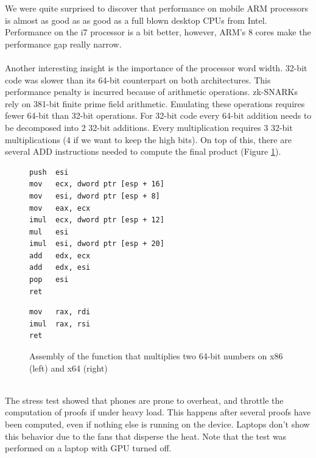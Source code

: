We were quite surprised to discover that performance on mobile ARM processors is almost as good as as good as a full blown desktop CPUs from Intel. Performance on the i7 processor is a bit better, however, ARM's 8 cores make the performance gap really narrow.\\
\\
Another interesting insight is the importance of the processor word width. 32-bit code was slower than its 64-bit counterpart on both architectures. This performance penalty is incurred because of arithmetic operations. zk-SNARKs rely on 381-bit finite prime field arithmetic. Emulating these operations requires fewer 64-bit than 32-bit operations. For 32-bit code every 64-bit addition needs to be decomposed into 2 32-bit additions. Every multiplication requires 3 32-bit multiplications (4 if we want to keep the high bits). On top of this, there are several ADD instructions needed to compute the final product (Figure \ref{fig:mulcomp}).\\
\begin{figure}[h]
    \centering
    \begin{minipage}[t]{0.45\linewidth}
        \begin{lstlisting}[basicstyle=\small,language={[x86masm]Assembler}]
push  esi
mov   ecx, dword ptr [esp + 16]
mov   esi, dword ptr [esp + 8]
mov   eax, ecx
imul  ecx, dword ptr [esp + 12]
mul   esi
imul  esi, dword ptr [esp + 20]
add   edx, ecx
add   edx, esi
pop   esi
ret
        \end{lstlisting}
        \end{minipage}%
        \hfill\vrule\hfill
        \begin{minipage}[t]{0.45\linewidth}
        \begin{lstlisting}[basicstyle=\small,language={[x64]Assembler}]
mov   rax, rdi
imul  rax, rsi
ret
        \end{lstlisting}
        \end{minipage}

        \caption{Assembly of the function that multiplies two 64-bit numbers on x86 (left) and x64 (right)}
        \label{fig:mulcomp}
\end{figure}
\\
\noindent The stress test showed that phones are prone to overheat, and throttle the computation of proofs if under heavy load. This happens after several proofs have been computed, even if nothing else is running on the device. Laptops don't show this behavior due to the fans that disperse the heat. Note that the test was performed on a laptop with GPU turned off.

